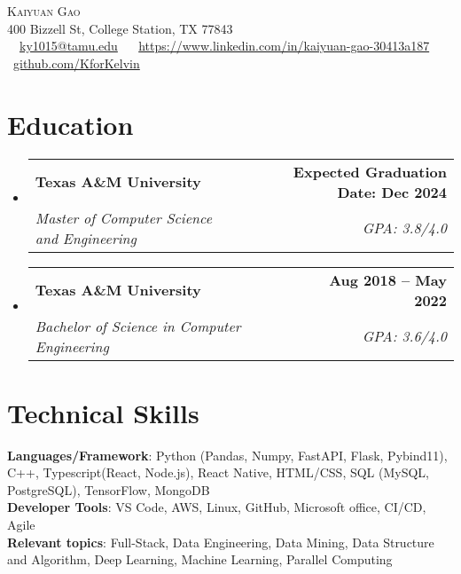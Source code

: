 \documentclass[letterpaper,11pt]{article}
\makeatletter
\newcommand{\resumeSubheading}[4]{
  \vspace{-2pt}\item
    \begin{tabular*}{1.0\textwidth}[t]{l@{\extracolsep{\fill}}r}
      \textbf{#1} & \textbf{\small #2} \\
      \textit{\small#3} & \textit{\small #4} \\
    \end{tabular*}\vspace{-7pt}
}
\newcommand{\resumeSubHeadingListStart}{\begin{itemize}[leftmargin=0.0in, label={}]}
\newcommand{\resumeSubHeadingListEnd}{\end{itemize}}
\makeatother
\begin{document}

\begin{center}
    {\Huge \scshape Kaiyuan Gao} \\ \vspace{1pt}
    400 Bizzell St, College Station, TX 77843 \\ \vspace{1pt}
    \small \raisebox{-0.1\height}\  {\raisebox{-0.2\height}\  \underline{ky1015@tamu.edu}} ~ 
    {\raisebox{-0.2\height}\ \underline{https://www.linkedin.com/in/kaiyuan-gao-30413a187}}  ~
   {\raisebox{-0.2\height}\ \underline{github.com/KforKelvin}}
    \vspace{-8pt}
\end{center}


\section{Education}
\vspace{3pt}
  \resumeSubHeadingListStart
      \resumeSubheading
      {Texas A\&M University}{Expected Graduation Date: Dec 2024}
      {Master of Computer Science and Engineering}{GPA: 3.8/4.0}
    \resumeSubheading
      {Texas A\&M University}{Aug 2018 -- May 2022}
      {Bachelor of Science in Computer Engineering}{GPA: 3.6/4.0}
      

  \resumeSubHeadingListEnd
\section{Technical Skills}
\vspace{3pt}
 \begin{itemize}[leftmargin=0.15in, label={}]
    {\item{
     \textbf{Languages/Framework}{: Python (Pandas, Numpy, FastAPI, Flask, Pybind11), C++, Typescript(React, Node.js), React Native, HTML/CSS, SQL (MySQL, PostgreSQL), TensorFlow, MongoDB}\\
     \textbf{Developer Tools}{: VS Code, AWS, Linux, GitHub, Microsoft office, CI/CD, Agile} \\
     \textbf{Relevant topics}{: Full-Stack, Data Engineering, Data Mining, Data Structure and Algorithm, Deep Learning, Machine Learning, Parallel Computing} }}
 \end{itemize}
 \vspace{-10 pt}
 \vspace{0 pt}
\end{document}
